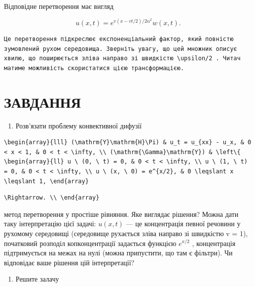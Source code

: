 \documentclass[
  ukrainian,
]{article}
\providecommand{\tightlist}{%
  \setlength{\itemsep}{0pt}\setlength{\parskip}{0pt}}
\begin{document}
Відповідне перетворення має вигляд

\[
u(x, t) = e^{v(x-vt/2)/2\alpha^2}w(x, t).
\]

\begin{verbatim}
Це перетворення підкреслює експоненціальний фактор, який повністю зумовлений рухом середовища. Зверніть увагу, що цей множник описує хвилю, що поширюється зліва направо зі швидкістю \upsilon/2 . Читач матиме можливість скористатися цією трансформацією.
\end{verbatim}

\section{ЗАВДАННЯ}\label{ux437ux430ux432ux434ux430ux43dux43dux44f-6}

\begin{enumerate}
\def\labelenumi{\arabic{enumi}.}
\tightlist
\item
  Розв'язати проблему конвективної дифузії
\end{enumerate}

\begin{verbatim}
\begin{array}{lll} (\mathrm{Y}\mathrm{H}\Pi) & u_t = u_{xx} - u_x, & 0 < x < 1, & 0 < t < \infty, \\ (\mathrm{\Gamma}\mathrm{Y}) & \left\{ \begin{array}{ll} u \ (0, \ t) = 0, & 0 < t < \infty, \\ u \ (1, \ t) = 0, & 0 < t < \infty, \\ u \ (x, \ 0) = e^{x/2}, & 0 \leqslant x \leqslant 1, \end{array}
\end{verbatim}

\begin{verbatim}
\Rightarrow. \\ \end{array}
\end{verbatim}

метод перетворення у простіше рівняння. Яке виглядає рішення? Можна дати
таку інтерпретацію цієї задачі: \(u(x, t)\) --- це концентрація певної
речовини у рухомому середовищі (середовище рухається зліва направо зі
швидкістю v = 1), початковий розподіл копконцентрації задається функцією
\(e^{x/2}\) , концентрація підтримується на межах на нулі (можна
припустити, що там є фільтри). Чи відповідає ваше рішення цій
інтерпретації?

\begin{enumerate}
\def\labelenumi{\arabic{enumi}.}
\setcounter{enumi}{1}
\tightlist
\item
  Решите залачу
\end{enumerate}
\end{document}
